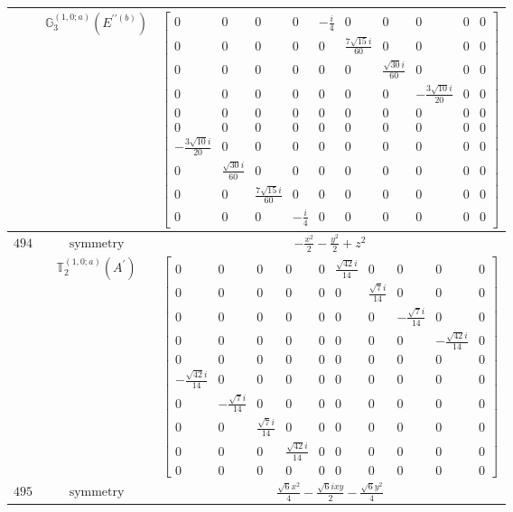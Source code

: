 \documentclass[fleqn,8pt,landscape]{jsarticle}
\begin{document}
\begin{longtable}{ccc}
$  $ & $ \mathbb{G}_{3}^{(1,0;a)}(E^{\prime\prime(b)}) $ & $ \begin{bmatrix} 0 & 0 & 0 & 0 & - \frac{i}{4} & 0 & 0 & 0 & 0 & 0 \\ 0 & 0 & 0 & 0 & 0 & \frac{7 \sqrt{15} i}{60} & 0 & 0 & 0 & 0 \\ 0 & 0 & 0 & 0 & 0 & 0 & \frac{\sqrt{30} i}{60} & 0 & 0 & 0 \\ 0 & 0 & 0 & 0 & 0 & 0 & 0 & - \frac{3 \sqrt{10} i}{20} & 0 & 0 \\ 0 & 0 & 0 & 0 & 0 & 0 & 0 & 0 & 0 & 0 \\ 0 & 0 & 0 & 0 & 0 & 0 & 0 & 0 & 0 & 0 \\ - \frac{3 \sqrt{10} i}{20} & 0 & 0 & 0 & 0 & 0 & 0 & 0 & 0 & 0 \\ 0 & \frac{\sqrt{30} i}{60} & 0 & 0 & 0 & 0 & 0 & 0 & 0 & 0 \\ 0 & 0 & \frac{7 \sqrt{15} i}{60} & 0 & 0 & 0 & 0 & 0 & 0 & 0 \\ 0 & 0 & 0 & - \frac{i}{4} & 0 & 0 & 0 & 0 & 0 & 0 \end{bmatrix} $ \\ \hline
$ 494 $ & $ \text{symmetry} $ & $ - \frac{x^{2}}{2} - \frac{y^{2}}{2} + z^{2} $ \\
$  $ & $ \mathbb{T}_{2}^{(1,0;a)}(A^{\prime}) $ & $ \begin{bmatrix} 0 & 0 & 0 & 0 & 0 & \frac{\sqrt{42} i}{14} & 0 & 0 & 0 & 0 \\ 0 & 0 & 0 & 0 & 0 & 0 & \frac{\sqrt{7} i}{14} & 0 & 0 & 0 \\ 0 & 0 & 0 & 0 & 0 & 0 & 0 & - \frac{\sqrt{7} i}{14} & 0 & 0 \\ 0 & 0 & 0 & 0 & 0 & 0 & 0 & 0 & - \frac{\sqrt{42} i}{14} & 0 \\ 0 & 0 & 0 & 0 & 0 & 0 & 0 & 0 & 0 & 0 \\ - \frac{\sqrt{42} i}{14} & 0 & 0 & 0 & 0 & 0 & 0 & 0 & 0 & 0 \\ 0 & - \frac{\sqrt{7} i}{14} & 0 & 0 & 0 & 0 & 0 & 0 & 0 & 0 \\ 0 & 0 & \frac{\sqrt{7} i}{14} & 0 & 0 & 0 & 0 & 0 & 0 & 0 \\ 0 & 0 & 0 & \frac{\sqrt{42} i}{14} & 0 & 0 & 0 & 0 & 0 & 0 \\ 0 & 0 & 0 & 0 & 0 & 0 & 0 & 0 & 0 & 0 \end{bmatrix} $ \\ \hline
$ 495 $ & $ \text{symmetry} $ & $ \frac{\sqrt{6} x^{2}}{4} - \frac{\sqrt{6} i x y}{2} - \frac{\sqrt{6} y^{2}}{4} $ \\

\end{longtable}
\end{document}
